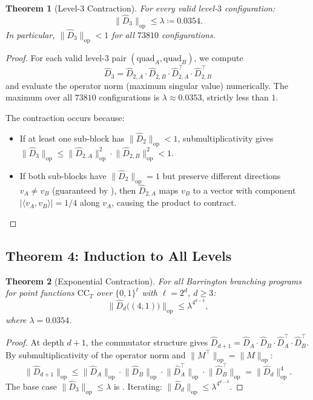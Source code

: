 \documentclass[11pt]{article}
\newtheorem{theorem}{Theorem}[section]
\newcommand{\norm}[1]{\lVert #1 \rVert}
\newcommand{\abs}[1]{\lvert #1 \rvert}
\newcommand{\opn}[1]{\norm{#1}_{\mathrm{op}}}
\newcommand{\Dhat}{\widehat{D}}
\newcommand{\CC}{\mathrm{CC}}
\begin{document}
\begin{theorem}[Level-$3$ Contraction]
\label{thm:level23}
For every valid level-$3$ configuration:
\[
\opn{\Dhat_3} \leq \lambda \coloneqq 0.0354.
\]
In particular, $\opn{\Dhat_3} < 1$ for all $73810$ configurations.
\end{theorem}

\begin{proof}
For each valid level-$3$ pair $(\mathrm{quad}_A, \mathrm{quad}_B)$, we compute
\[
\Dhat_3 = \Dhat_{2,A} \cdot \Dhat_{2,B} \cdot \Dhat_{2,A}^\top \cdot \Dhat_{2,B}^\top
\]
and evaluate the operator norm (maximum singular value) numerically. The maximum
over all $73810$ configurations is $\lambda \approx 0.0353$, strictly less than $1$.

The contraction occurs because:
\begin{itemize}[nosep]
\item If at least one sub-block has $\opn{\Dhat_2} < 1$, submultiplicativity gives
  $\opn{\Dhat_3} \leq \opn{\Dhat_{2,A}}^2 \cdot \opn{\Dhat_{2,B}}^2 < 1$.
\item If both sub-blocks have $\opn{\Dhat_2} = 1$ but preserve different directions
  $v_A \neq v_B$ (guaranteed by ), then $\Dhat_{2,A}$ maps $v_B$
  to a vector with component $\abs{\langle v_A, v_B \rangle} = 1/4$ along $v_A$,
  causing the product to contract. \qedhere
\end{itemize}
\end{proof}


\subsection{Theorem 4: Induction to All Levels}

\begin{theorem}[Exponential Contraction]
\label{thm:induction}
For all Barrington branching programs for point functions $\CC_T$ over
$\{0,1\}^\ell$ with $\ell = 2^d$, $d \geq 3$:
\[
\opn{\Dhat_d\bigl((4,1)\bigr)} \leq \lambda^{4^{d-3}},
\]
where $\lambda = 0.0354$.
\end{theorem}

\begin{proof}
At depth $d+1$, the commutator structure gives
$\Dhat_{d+1} = \Dhat_A \cdot \Dhat_B \cdot \Dhat_A^\top \cdot \Dhat_B^\top$.
By submultiplicativity of the operator norm and $\opn{M^\top} = \opn{M}$:
\[
\opn{\Dhat_{d+1}} \leq \opn{\Dhat_A} \cdot \opn{\Dhat_B} \cdot
\opn{\Dhat_A^\top} \cdot \opn{\Dhat_B^\top} = \opn{\Dhat_d}^4.
\]
The base case $\opn{\Dhat_3} \leq \lambda$ is .
Iterating: $\opn{\Dhat_d} \leq \lambda^{4^{d-3}}$.
\end{proof}
\end{document}
